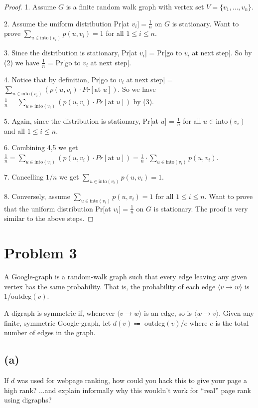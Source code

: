 \documentclass[14pt]{extarticle}
\newcommand{\dps}{\displaystyle}
\begin{document}
\begin{proof}
1. Assume $G$ is a finite random walk graph with vertex set $V = \{v_1, \ldots, v_n\}$.

2. Assume the uniform distribution Pr[at $v_i] = \frac{1}{n}$ on $G$ is stationary. Want to prove $\dps\sum_{u \in \text{into}(v_i)} p(u,v_i) = 1$ for all $1 \leq i \leq n$.

3. Since the distribution is stationary, Pr[at $v_i$] = Pr[go to $v_i$ at next step]. So by (2) we have $\frac{1}{n}$ = Pr[go to $v_i$ at next step].

4. Notice that by definition, Pr[go to $v_i$ at next step] = $\dps\sum_{u \in \text{into}(v_i)} (p(u,v_i) \cdot Pr[\text{at } u])$. So we have $\dps\frac{1}{n} = \sum_{u \in \text{into}(v_i)} (p(u,v_i) \cdot Pr[\text{at } u])$ by (3).

5. Again, since the distribution is stationary, Pr[at $u$] = $\frac{1}{n}$ for all $u \in \text{into}(v_i)$ and all $1 \leq i \leq n$.

6. Combining 4,5 we get $\dps\frac{1}{n} = \sum_{u \in \text{into}(v_i)} (p(u,v_i) \cdot Pr[\text{at } u]) = \frac{1}{n} \cdot\sum_{u \in \text{into}(v_i)} p(u,v_i)$.

7. Cancelling $1/n$ we get $\dps\sum_{u \in \text{into}(v_i)} p(u,v_i) = 1$.

8. Conversely, assume $\dps\sum_{u \in \text{into}(v_i)} p(u,v_i) = 1$ for all $1 \leq i \leq n$. Want to prove that the uniform distribution Pr[at $v_i] = \frac{1}{n}$ on $G$ is stationary. The proof is very similar to the above steps.
\end{proof}

\section{Problem 3}
A Google-graph is a random-walk graph such that every edge leaving any given vertex has the same proba­bility. That is, the probability of each edge $\langle v \to w \rangle$ is 1/outdeg$(v)$.

A digraph is symmetric if, whenever $\langle v \to w\rangle$ is an edge, so is $\langle w \to v\rangle$. Given any finite, symmetric Google-graph, let $d(v) \Coloneqq$ outdeg$(v) / e$ where $e$ is the total number of edges in the graph.

\subsection{(a)}
If $d$ was used for webpage ranking, how could you hack this to give your page a high rank? ...and explain informally why this wouldn’t work for “real” page rank using digraphs?
\end{document}
